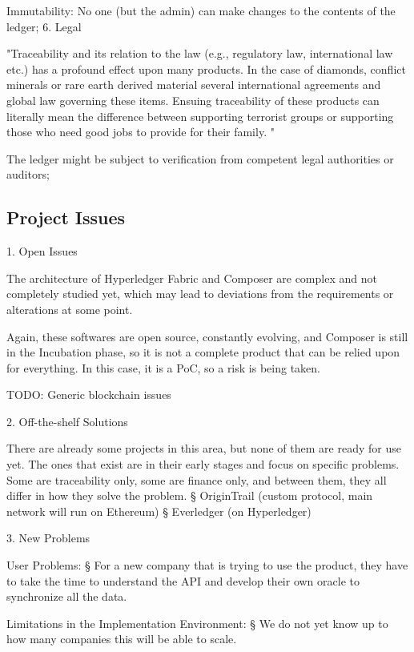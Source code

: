 		\par Immutability: No one (but the admin) can make changes to the contents of the ledger;
	6. Legal
		\par "Traceability and its relation to the law (e.g., regulatory law, international law etc.) has a profound effect upon many products. In the case of diamonds, conflict minerals or rare earth derived material several international agreements and global law governing these items. Ensuing traceability of these products can literally mean the difference between supporting terrorist groups or supporting those who need good jobs to provide for their family. "
		\par The ledger might be subject to verification from competent legal authorities or auditors;

\subsection{Project Issues}
	1. Open Issues
		\par The architecture of Hyperledger Fabric and Composer are complex and not completely studied yet, which may lead to deviations from the requirements or alterations at some point.
		\par Again, these softwares are open source, constantly evolving, and Composer is still in the Incubation phase, so it is not a complete product that can be relied upon for everything. In this 
		case, it is a PoC, so a risk is being taken.
		\par TODO: Generic blockchain issues
	
	2. Off-the-shelf Solutions
		\par There are already some projects in this area, but none of them are ready for use yet. The ones that exist are in their early stages and focus on specific problems. Some are traceability only, some are finance only, and between them, they all differ in how they solve the problem.
			§ OriginTrail (custom protocol, main network will run on Ethereum)
			§ Everledger (on Hyperledger)
			
	3. New Problems
		\par User Problems: 
			§ For a new company that is trying to use the product, they have to take the time to understand the API and develop their own oracle to synchronize all the data. 
		\par Limitations in the Implementation Environment:
			§ We do not yet know up to how many companies this will be able to scale.
		

